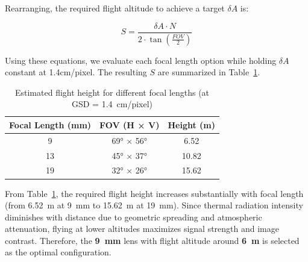 Rearranging, the required flight altitude to achieve a target \( \delta A \)  is:

\begin{equation}
S = \frac{\delta A \cdot N}{2 \cdot \tan(\frac{FOV}{2})}
\end{equation}

Using these equations, we evaluate each focal length option while holding \( \delta A \)  constant at 1.4cm/pixel. The resulting \( S \) are summarized in Table~\ref{tab:fov_results}.

\begin{table}[H]
\small
\centering
\caption[Flight height vs. focal length at 1.4~cm/pixel GSD]{Estimated flight height for different focal lengths (at GSD = 1.4~cm/pixel)}
\label{tab:fov_results}
\begin{tabular}{|c|c|c|}
\hline
\textbf{Focal Length (mm)} & \textbf{FOV (H × V)} & \textbf{Height (m)} \\
\hline
9  & 69° × 56° & 6.52   \\
\hline
13 & 45° × 37° & 10.82  \\
\hline
19 & 32° × 26° & 15.62  \\
\hline
\end{tabular}
\end{table}

From Table~\ref{tab:fov_results}, the required flight height increases substantially with focal length (from 6.52~m at 9~mm to 15.62~m at 19~mm). Since thermal radiation intensity diminishes with distance due to geometric spreading and atmospheric attenuation, flying at lower altitudes maximizes signal strength and image contrast. Therefore, the \textbf{9~mm} lens with flight altitude around \textbf{6~m} is selected as the optimal configuration.